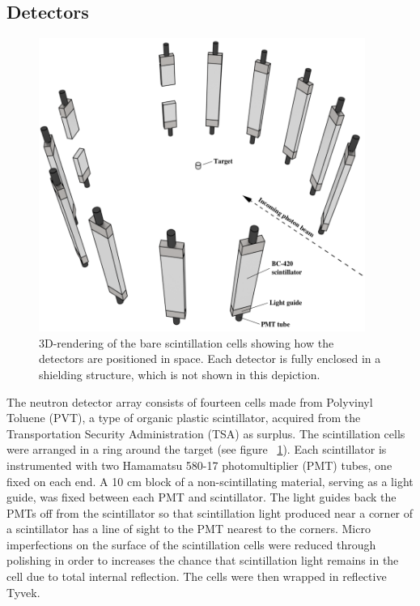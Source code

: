 \subsection{Detectors}
\label{section:Detectors}
\begin{figure}[h]
\centering
\includegraphics[width=0.95\textwidth]{Content/Methods/Detectors.png}
\caption{3D-rendering of the bare scintillation cells showing how the detectors are positioned in space.
Each detector is fully enclosed in a shielding structure, which is not shown in this depiction.}
\label{fig:DetGeom}
\end{figure}
The neutron detector array consists of fourteen cells made from Polyvinyl Toluene (PVT), a type of organic plastic scintillator, acquired from the Transportation Security Administration (TSA) as surplus.
The scintillation cells were arranged in a ring around the target (see figure ~\ref{fig:DetGeom}).
Each scintillator is instrumented with two Hamamatsu 580-17 photomultiplier (PMT) tubes, one fixed on each end.
A 10 cm block of a non-scintillating material, serving as a light guide, was fixed between each PMT and scintillator.
The light guides back the PMTs off from the scintillator so that scintillation light produced near a corner of a scintillator has a line of sight to the PMT nearest to the corners.
Micro imperfections on the surface of the scintillation cells were reduced through polishing in order to increases the chance that scintillation light remains in the cell due to total internal reflection.
The cells were then wrapped in reflective Tyvek.

